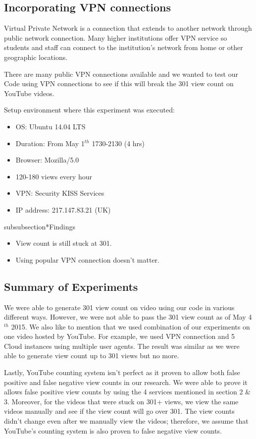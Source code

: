 \documentclass[conference]{IEEEtran}
\begin{document}
\subsection{Incorporating VPN connections}

Virtual Private Network is a connection that extends to another network through public network connection. Many higher institutions offer VPN service so students and staff can connect to the institution’s network from home or other geographic locations.

There are many public VPN connections available and we wanted to test our Code using VPN connections to see if this will break the 301 view count on YouTube videos.

Setup environment where this experiment was executed:
\begin{itemize}
  \setlength\itemsep{-0.1em}
  \item OS: Ubuntu 14.04 LTS
  \item Duration: From May 1$^{th}$ 1730-2130 (4 hrs)
  \item Browser: Mozilla/5.0
  \item 120-180 views every hour
  \item VPN: Security KISS Services
  \item IP address: 217.147.83.21 (UK)
\end{itemize}

subsubsection*{Findings}
\begin{itemize}
  \setlength\itemsep{-0.1em}
  \item View count is still stuck at 301.
  \item Using popular VPN connection doesn’t matter.
\end{itemize}

\subsection{Summary of Experiments}

We were able to generate 301 view count on video using our code in various different ways. However, we were not able to pass the 301 view count as of May 4$^{th}$ 2015. We also like to mention that we used combination of our experiments on one video hosted by YouTube. For example, we used VPN connection and 5 Cloud instances using multiple user agents. The result was similar as we were able to generate view count up to 301 views but no more.

Lastly, YouTube counting system isn’t perfect as it proven to allow both false positive and false negative view counts in our research. We were able to prove it allows false positive view counts by using the 4 services mentioned in section 2 \& 3. Moreover, for the videos that were stuck on 301+ views, we view the same videos manually and see if the view count will go over 301. The view counts didn’t change even after we manually view the videos; therefore, we assume that YouTube’s counting
system is also proven to false negative view counts.
\end{document}
